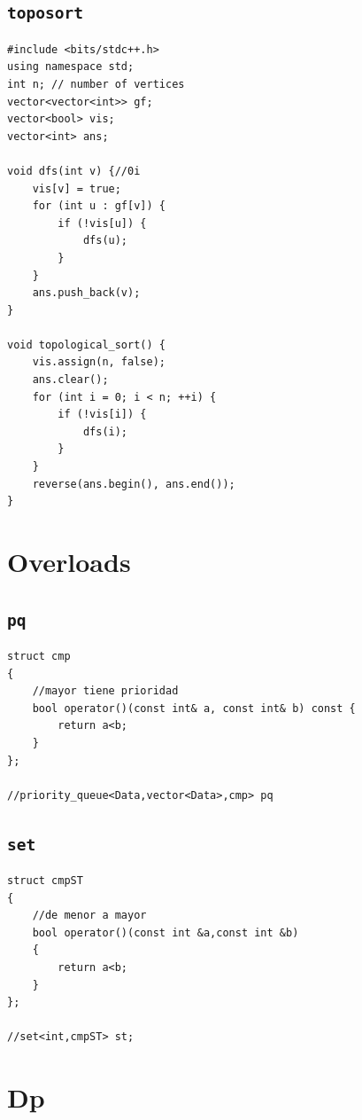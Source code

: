 \subsection{\texttt{toposort}}
\begin{lstlisting}
#include <bits/stdc++.h>
using namespace std;
int n; // number of vertices
vector<vector<int>> gf;
vector<bool> vis;
vector<int> ans;

void dfs(int v) {//0i
    vis[v] = true;
    for (int u : gf[v]) {
        if (!vis[u]) {
            dfs(u);
        }
    }
    ans.push_back(v);
}

void topological_sort() {
    vis.assign(n, false);
    ans.clear();
    for (int i = 0; i < n; ++i) {
        if (!vis[i]) {
            dfs(i);
        }
    }
    reverse(ans.begin(), ans.end());
}\end{lstlisting}

\section{Overloads}

\subsection{\texttt{pq}}
\begin{lstlisting}
struct cmp
{
    //mayor tiene prioridad
    bool operator()(const int& a, const int& b) const {
        return a<b;        
    }
};

//priority_queue<Data,vector<Data>,cmp> pq
\end{lstlisting}

\subsection{\texttt{set}}
\begin{lstlisting}
struct cmpST
{
    //de menor a mayor
    bool operator()(const int &a,const int &b)
    {
        return a<b;
    }
};

//set<int,cmpST> st;
\end{lstlisting}

\section{Dp}

